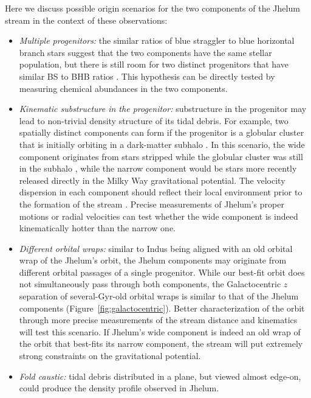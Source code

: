 \documentclass[twocolumn]{aastex62}
\begin{document}
Here we discuss possible origin scenarios for the two components of the Jhelum stream in the context of these observations:
\begin{itemize}
 \item{\emph{Multiple progenitors:} the similar ratios of blue straggler to blue horizontal branch stars suggest that the two components have the same stellar population, but there is still room for two distinct progenitors that have similar BS to BHB ratios \citep[e.g., a system of a low-mass globular cluster and a low-mass dwarf galaxy,][]{deason2015}.
 This hypothesis can be directly tested by measuring chemical abundances in the two components.
 }
 \item{\emph{Kinematic substructure in the progenitor:} substructure in the progenitor may lead to non-trivial density structure of its tidal debris.
 For example, two spatially distinct components can form if the progenitor is a globular cluster that is initially orbiting in a dark-matter subhalo \citep[e.g.,][]{penarrubia2017, carlberg2018}.
 In this scenario, the wide component originates from stars stripped while the globular cluster was still in the subhalo \citep[similar to the recently reported GD-1 cocoon,][]{malhan2019}, while the narrow component would be stars more recently released directly in the Milky Way gravitational potential.
 The velocity dispersion in each component should reflect their local environment prior to the formation of the stream \citep[e.g.,][]{fardal2015}.
 Precise measurements of Jhelum's proper motions or radial velocities can test whether the wide component is indeed kinematically hotter than the narrow one.
 }
 \item{\emph{Different orbital wraps:} similar to Indus being aligned with an old orbital wrap of the Jhelum's orbit, the Jhelum components may originate from different orbital passages of a single progenitor.
 While our best-fit orbit does not simultaneously pass through both components, the Galactocentric $z$ separation of several-Gyr-old orbital wraps is similar to that of the Jhelum components (Figure~\ref{fig:galactocentric}).
 Better characterization of the orbit through more precise measurements of the stream distance and kinematics will test this scenario.
 If Jhelum's wide component is indeed an old wrap of the orbit that best-fits its narrow component, the stream will put extremely strong constraints on the gravitational potential.
 }
 \item{\emph{Fold caustic:} tidal debris distributed in a plane, but viewed almost edge-on, could produce the density profile observed in Jhelum.
}
\end{itemize}
\end{document}
